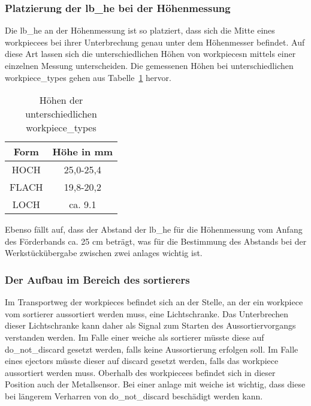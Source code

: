 \subsubsection{Platzierung der \gls{lb_he} bei der Höhenmessung}

Die \gls{lb_he} an der Höhenmessung ist so platziert, dass sich die Mitte eines \Gls{workpiece}es bei ihrer
Unterbrechung genau unter dem Höhenmesser befindet.
Auf diese Art lassen sich die unterschiedlichen Höhen von \Glspl{workpiece}n mittels einer einzelnen Messung unterscheiden.
Die gemessenen Höhen bei unterschiedlichen \glspl{workpiece_type} gehen aus Tabelle~\ref{tab:werkstuecke} hervor.

\begin{table}[h]
    \begin{center}
        \begin{tabular}{ |c|c| }
            \hline
            Form                     & Höhe in mm \\
            \hline\hline
            HOCH                 &  25,0-25,4\\
            \hline
            FLACH                     & 19,8-20,2 \\
            \hline
            LOCH               & ca. 9.1 \\
            \hline
        \end{tabular}
    \end{center}
    \caption{Höhen der unterschiedlichen \glspl{workpiece_type}}
    \label{tab:werkstuecke}
\end{table}

Ebenso fällt auf, dass der Abstand der \gls{lb_he} für die Höhenmessung vom Anfang des Förderbands ca. 25 cm beträgt,
was für die Bestimmung des Abstands bei der Werkstückübergabe zwischen zwei \glspl{anlage} wichtig ist.

\subsubsection{Der Aufbau im Bereich des \gls{sortierer}s}

Im Transportweg der \Glspl{workpiece} befindet sich an der Stelle, an der ein \Gls{workpiece} vom \gls{sortierer} aussortiert
werden muss, eine Lichtschranke.
Das Unterbrechen dieser Lichtschranke kann daher als Signal zum Starten des Aussortiervorgangs verstanden werden.
Im Falle einer \gls{weiche} als \gls{sortierer} müsste diese auf \gls{do_not_discard} gesetzt werden, falls keine Aussortierung erfolgen soll.
Im Falle eines \Gls{ejector}s müsste dieser auf \gls{discard} gesetzt werden, falls das \Gls{workpiece} aussortiert werden muss.
Oberhalb des \Gls{workpiece}es befindet sich in dieser Position auch der Metallsensor.
Bei einer \gls{anlage} mit \gls{weiche} ist wichtig, dass diese bei längerem Verharren von \gls{do_not_discard} beschädigt werden kann.

